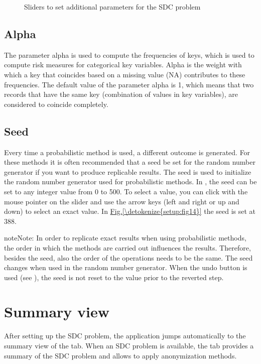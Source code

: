 \documentclass[letterpaper,10pt,english]{sphinxmanual}
\begin{document}
\begin{figure}[htbp]
\centering
\capstart

\noindent{}
\caption{Sliders to set additional parameters for the SDC problem}\label{\detokenize{setup:fig14}}\label{\detokenize{setup:id5}}\end{figure}


\subsection{Alpha}
\label{\detokenize{setup:alpha}}
The parameter alpha is used to compute the frequencies of keys, which is used to compute risk
measures for categorical key variables. Alpha is the weight with which a key that coincides
based on a missing value (NA) contributes to these frequencies. The default value of the
parameter alpha is 1, which means that two records that have the same key (combination
of values in key variables), are considered to coincide completely.


\subsection{Seed}
\label{\detokenize{setup:seed}}
Every time a probabilistic method is used, a different outcome is generated. For these
methods it is often recommended that a seed be set for the random number generator
if you want to produce replicable results. The seed is used to initialize the
random number generator used for probabilistic methods. In , the seed can
be set to any integer value from 0 to 500. To select a value, you can click with
the mouse pointer on the slider and use the arrow keys (left and right or up and down)
to select an exact value. In \hyperref[\detokenize{setup:fig14}]{Fig.\@ \ref{\detokenize{setup:fig14}}} the seed is set at 388.

\begin{sphinxadmonition}{note}{Note:}
In order to replicate exact results when using probabilistic methods, the order in
which the methods are carried out influences the results. Therefore, besides the seed,
also the order of the operations needs to be the same. The seed changes when used in
the random number generator. When the undo button is used (see ), the seed is not
reset to the value prior to the reverted step.
\end{sphinxadmonition}


\section{Summary view}
\label{\detokenize{setup:summary-view}}
After setting up the SDC problem, the application jumps automatically to the summary
view of the  tab. When an SDC problem is available, the  tab
provides a summary of the SDC problem and allows to apply anonymization methods.
\end{document}
